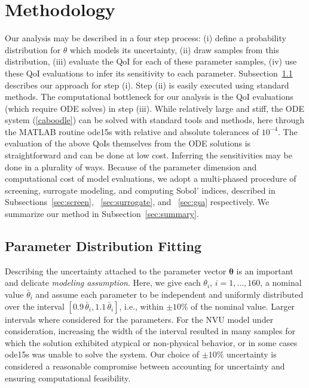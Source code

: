 \section{Methodology}\label{sec:meth}

Our analysis may be described in a four step process: (i) define a probability distribution for $\theta$ which models its uncertainty, (ii) draw samples from this distribution, (iii) evaluate the QoI for each of these parameter samples, (iv) use these QoI evaluations to infer its sensitivity to each parameter. Subsection~\ref{sec:param_dist_fit} describes our approach for step (i). Step (ii) is easily executed using standard methods. The computational bottleneck for our analysis is the QoI evaluations (which require ODE solves) in step (iii). While relatively large and stiff, the ODE system (\ref{caboodle}) can be  solved with standard tools and methods, here through the MATLAB routine ode15s with relative and absolute tolerances of $10^{-4}$. The evaluation of the above QoIs themselves from the ODE solutions is straightforward and can be done at low cost. Inferring the sensitivities may be done in a plurality of ways. Because of the parameter dimension and computational cost of model evaluations, we adopt a multi-phased procedure of screening, surrogate modeling, and computing Sobol' indices, described in Subsections~\ref{sec:screen}, ~\ref{sec:surrogate}, and ~\ref{sec:gsa} respectively. We summarize our method in Subsection~\ref{sec:summary}.

\subsection{Parameter Distribution Fitting}
\label{sec:param_dist_fit}

Describing the uncertainty attached to the parameter vector $\boldsymbol{\theta}$ is an important and delicate {\sl modeling assumption}. Here, we give each $\theta_i$, $i=1,\dots, 160$, a nominal value $\bar \theta_i$ and assume each parameter to be independent and uniformly distributed over the interval $[0.9\, \bar\theta_i, 1.1 \,\bar\theta_i]$, i.e., within $\pm 10\%$ of the nominal value. Larger intervals where considered for the parameters. For the NVU model under consideration, increasing the width of the interval resulted in many samples for which the solution exhibited atypical or non-physical behavior, or in some cases ode15s was unable to solve the system. Our choice of $\pm 10\%$ uncertainty is considered a reasonable compromise between accounting for uncertainty and ensuring computational feasibility. 
	
